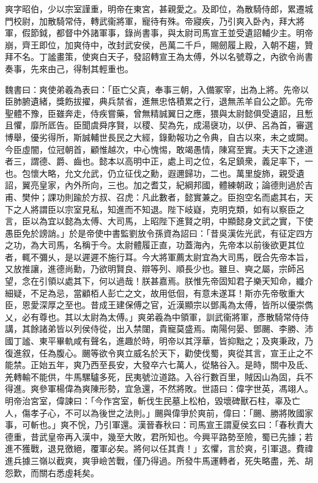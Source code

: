 
\begin{pinyinscope}
爽字昭伯，少以宗室謹重，明帝在東宮，甚親愛之。及即位，為散騎侍郎，累遷城門校尉，加散騎常侍，轉武衞將軍，寵待有殊。帝寢疾，乃引爽入卧內，拜大將軍，假節鉞，都督中外諸軍事，錄尚書事，與太尉司馬宣王並受遺詔輔少主。明帝崩，齊王即位，加爽侍中，改封武安侯，邑萬二千戶，賜劒履上殿，入朝不趨，贊拜不名。丁謐畫策，使爽白天子，發詔轉宣王為太傅，外以名號尊之，內欲令尚書奏事，先來由己，得制其輕重也。

魏書曰：爽使弟羲為表曰：「臣亡父真，奉事三朝，入備冢宰，出為上將。先帝以臣肺腑遺緒，獎飭拔擢，典兵禁省，進無忠恪積累之行，退無羔羊自公之節。先帝聖體不豫，臣雖奔走，侍疾嘗藥，曾無精誠翼日之應，猥與太尉懿俱受遺詔，且慙且懼，靡所厎告。臣聞虞舜序賢，以稷、契為先，成湯襃功，以伊、呂為首，審選博舉，優劣得所，斯誠輔世長民之大經，錄勳報功之令典，自古以來，未之或闕。今臣虛闇，位冠朝首，顧惟越次，中心愧惕，敢竭愚情，陳寫至實。夫天下之達道者三，謂德、爵、齒也。懿本以高明中正，處上司之位，名足鎮衆，義足率下，一也。包懷大略，允文允武，仍立征伐之勳，遐邇歸功，二也。萬里旋斾，親受遺詔，翼亮皇家，內外所向，三也。加之耆艾，紀綱邦國，體練朝政；論德則過於吉甫、樊仲；課功則踰於方叔、召虎：凡此數者，懿實兼之。臣抱空名而處其右，天下之人將謂臣以宗室見私，知進而不知退。陛下岐嶷，克明克類，如有以察臣之言，臣以為宜以懿為太傅、大司馬，上昭陛下進賢之明，中顯懿身文武之實，下使愚臣免於謗誚。」於是帝使中書監劉放令孫資為詔曰：「昔吳漢佐光武，有征定四方之功，為大司馬，名稱于今。太尉體履正直，功蓋海內，先帝本以前後欲更其位者，輒不彌乆，是以遲遲不施行耳。今大將軍薦太尉宜為大司馬，旣合先帝本旨，又放推讓，進德尚勳，乃欲明賢良、辯等列、順長少也。雖旦、奭之屬，宗師呂望，念在引領以處其下，何以過哉！朕甚嘉焉。朕惟先帝固知君子樂天知命，纖介細疑，不足為忌，當顧栢人彭亡之文，故用低佪，有意未遂耳！斯亦先帝敬重大臣，恩愛深厚之至也。昔成王建保傅之官，近漢顯宗以鄧禹為太傅，皆所以優崇儁乂，必有尊也。其以太尉為太傅。」爽弟羲為中領軍，訓武衞將軍，彥散騎常侍侍講，其餘諸弟皆以列侯侍從，出入禁闥，貴寵莫盛焉。南陽何晏、鄧颺、李勝、沛國丁謐、東平畢軌咸有聲名，進趣於時，明帝以其浮華，皆抑黜之；及爽秉政，乃復進叙，任為腹心。颺等欲令爽立威名於天下，勸使伐蜀，爽從其言，宣王止之不能禁。正始五年，爽乃西至長安，大發卒六七萬人，從駱谷入。是時，關中及氐、羌轉輸不能供，牛馬騾驢多死，民夷號泣道路。入谷行數百里，賊因山為固，兵不得進。爽參軍楊偉為爽陳形勢，宜急還，不然將敗。世語曰：偉字世英，馮翊人。明帝治宮室，偉諫曰：「今作宮室，斬伐生民墓上松柏，毀壞碑獸石柱，辜及亡人，傷孝子心，不可以為後世之法則。」颺與偉爭於爽前，偉曰：「颺、勝將敗國家事，可斬也。」爽不恱，乃引軍還。漢晉春秋曰：司馬宣王謂夏侯玄曰：「春秋責大德重，昔武皇帝再入漢中，幾至大敗，君所知也。今興平路勢至險，蜀已先據；若進不獲戰，退見徼絕，覆軍必矣。將何以任其責！」玄懼，言於爽，引軍退。費禕進兵據三嶺以截爽，爽爭嶮苦戰，僅乃得過。所發牛馬運轉者，死失略盡，羌、胡怨歎，而關右悉虛耗矣。


\end{pinyinscope}
